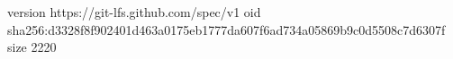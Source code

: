 version https://git-lfs.github.com/spec/v1
oid sha256:d3328f8f902401d463a0175eb1777da607f6ad734a05869b9c0d5508c7d6307f
size 2220
